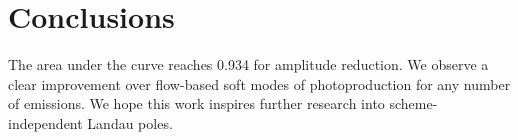 \section{Conclusions}\label{sec:conclusions}

The area under the curve reaches 0.934 for amplitude reduction. We
observe a clear improvement over flow-based soft modes of
photoproduction for any number of emissions. We hope this work inspires
further research into scheme-independent Landau poles.

